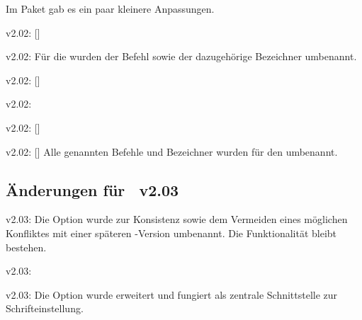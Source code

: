 Im Paket  gab es ein paar kleinere Anpassungen.
\begin{Bundle}{}
\begin{Obsolete}{v2.02:}{%
  []%
}
\begin{Obsolete}{v2.02:}{}
\printobsoletelist%
%
Für die \taskname{} wurden der Befehl sowie der dazugehörige Bezeichner 
umbenannt.
\end{Obsolete}
\end{Obsolete}

\begin{Obsolete}{v2.02:}{%
  []%
}
\begin{Obsolete}{v2.02:}{}
\begin{Obsolete}{v2.02:}{%
  []%
}
\begin{Obsolete}{v2.02:}{%
  []%
}
\printobsoletelist%
%
Alle genannten Befehle und Bezeichner wurden für den \noticename{} umbenannt.
\end{Obsolete}
\end{Obsolete}
\end{Obsolete}
\end{Obsolete}
\end{Bundle}


%
\subsection{Änderungen für \TUDScript~v2.03}
\begin{Obsolete}{v2.03:}{}
\printobsoletelist%
%
Die Option  wurde zur Konsistenz sowie dem Vermeiden 
eines möglichen Konfliktes mit einer späteren \KOMAScript-Version umbenannt. 
Die Funktionalität bleibt bestehen.
\end{Obsolete}

\begin{Obsolete}{v2.03:}{}
\begin{Obsolete}{v2.03:}{}
\printobsoletelist%
%
Die Option  wurde erweitert und fungiert als zentrale 
Schnittstelle zur Schrifteinstellung. 
\end{Obsolete}
\end{Obsolete}

